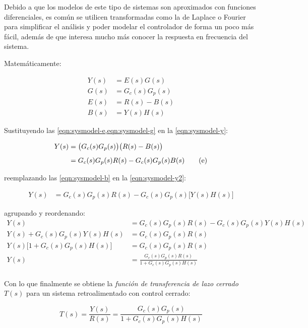 Debido a que los modelos de este tipo de sistemas son aproximados con funciones diferenciales, es común se utilicen transformadas como la de Laplace o Fourier para simplificar el análisis y poder modelar el controlador de forma un poco más fácil, además de que interesa mucho más conocer la respuesta en frecuencia del sistema.

Matemáticamente:

\begin{align}
	Y(s) &= E(s)G(s)%
	\tag{a}\label{eqn:sysmodel-y}\\[5pt]
	G(s) &= G_{c}(s)G_{p}(s)%
	\tag{b}\label{eqn:sysmodel-g}\\[5pt]
	E(s) &= R(s)-B(s)%
	\tag{c}\label{eqn:sysmodel-e}\\[5pt]
	B(s) &= Y(s)H(s)%
	\tag{d}\label{eqn:sysmodel-b}
\end{align}

Sustituyendo las \cref{eqn:sysmodel-e,eqn:sysmodel-g} en la \cref{eqn:sysmodel-y}:

\begin{align}
	Y(s) &= \big(G_{c}(s)G_{p}(s)\big)\big(R(s)-B(s)\big)
	\notag{}\\[5pt]%
	&= G_{c}(s)G_{p}(s)R(s)-G_{c}(s)G_{p}(s)B(s)
	\tag{e}\label{eqn:sysmodel-y2}
\end{align}

reemplazando las \cref{eqn:sysmodel-b} en la \cref{eqn:sysmodel-y2}:

\begin{align}
	Y(s) &=
		G_{c}(s)G_{p}(s)R(s)
		-
		G_{c}(s)G_{p}(s)\Big[Y(s)H(s)\Big]
	\tag{f}\label{eqn:sysmodel-y3}
\end{align}

agrupando y reordenando:
\begin{align*}
	Y(s) &=
		G_{c}(s)G_{p}(s)R(s) -
		G_{c}(s)G_{p}(s)Y(s)H(s)\\[5pt]
	Y(s) + G_{c}(s)G_{p}(s)Y(s)H(s) &=
		G_{c}(s)G_{p}(s)R(s)\\[5pt]
	Y(s)\Big[1 + G_{c}(s)G_{p}(s)H(s)\Big] &=
		G_{c}(s)G_{p}(s)R(s)\\[5pt]
	Y(s) &= \frac%
		{G_{c}(s)G_{p}(s)R(s)}%
		{1 + G_{c}(s)G_{p}(s)H(s)}\\[5pt]
\end{align*}

Con lo que finalmente se obtiene la \emph{función de transferencia de lazo cerrado} $T(s)$ para un sistema retroalimentado con control cerrado:

\begin{equation}
	T(s) = \frac{Y(s)}{R(s)} =
	\frac{G_{c}(s)G_{p}(s)}{1 + G_{c}(s)G_{p}(s)H(s)}
	\label{eqn:transfer}
\end{equation}

